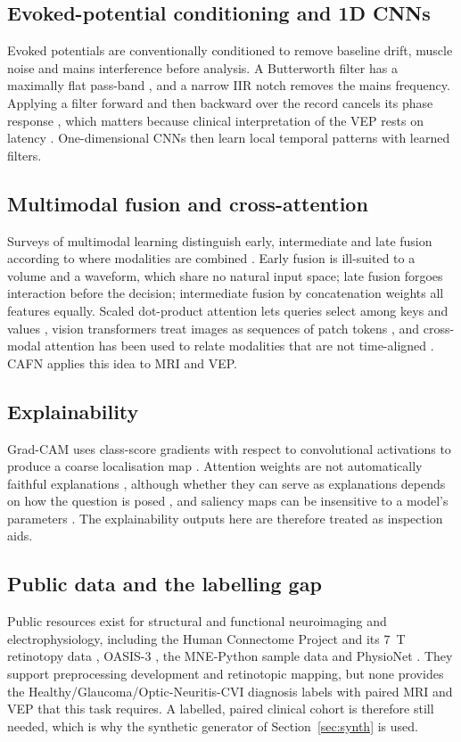 \documentclass{ieeeaccessapprox}
\begin{document}
\subsection{Evoked-potential conditioning and 1D CNNs}
Evoked potentials are conventionally conditioned to remove baseline drift, muscle noise and mains interference before analysis. A Butterworth filter has a maximally flat pass-band \cite{butterworth1930}, and a narrow IIR notch removes the mains frequency. Applying a filter forward and then backward over the record cancels its phase response \cite{gustafsson1996,oppenheim2010}, which matters because clinical interpretation of the VEP rests on latency \cite{odom2016}. One-dimensional CNNs then learn local temporal patterns with learned filters.

\subsection{Multimodal fusion and cross-attention}
Surveys of multimodal learning distinguish early, intermediate and late fusion according to where modalities are combined \cite{baltrusaitis2019,ramachandram2017}. Early fusion is ill-suited to a volume and a waveform, which share no natural input space; late fusion forgoes interaction before the decision; intermediate fusion by concatenation weights all features equally. Scaled dot-product attention lets queries select among keys and values \cite{vaswani2017}, vision transformers treat images as sequences of patch tokens \cite{dosovitskiy2021}, and cross-modal attention has been used to relate modalities that are not time-aligned \cite{tsai2019,lu2019}. CAFN applies this idea to MRI and VEP.

\subsection{Explainability}
Grad-CAM uses class-score gradients with respect to convolutional activations to produce a coarse localisation map \cite{selvaraju2017}. Attention weights are not automatically faithful explanations \cite{jain2019}, although whether they can serve as explanations depends on how the question is posed \cite{wiegreffe2019}, and saliency maps can be insensitive to a model's parameters \cite{adebayo2018}. The explainability outputs here are therefore treated as inspection aids.

\subsection{Public data and the labelling gap}
Public resources exist for structural and functional neuroimaging and electrophysiology, including the Human Connectome Project and its 7~T retinotopy data \cite{vanessen2013,benson2018}, OASIS-3 \cite{lamontagne2019}, the MNE-Python sample data \cite{gramfort2013} and PhysioNet \cite{goldberger2000}. They support preprocessing development and retinotopic mapping, but none provides the Healthy/Glaucoma/Optic-Neuritis-CVI diagnosis labels with paired MRI and VEP that this task requires. A labelled, paired clinical cohort is therefore still needed, which is why the synthetic generator of Section~\ref{sec:synth} is used.
\end{document}
